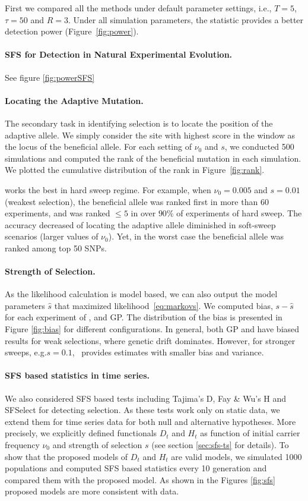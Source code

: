 \documentclass[11pt]{article}
\def\comale{\text{COMALE }}
\begin{document}
First we compared all the methods under default parameter settings,
i.e., $T=5$, $\tau=50$ and $R=3$. Under all simulation parameters, the
\comale statistic provides a better detection power
(Figure~\ref{fig:power}).


\paragraph{SFS for Detection in Natural Experimental Evolution.} See figure \ref{fig:powerSFS}
\paragraph{Locating the Adaptive Mutation.}
The secondary task in identifying selection is to locate the position
of the adaptive allele. We simply consider the site with highest score
in the window as the locus of the beneficial allele. For each setting
of $\nu_0$ and $s$, we conducted 500 simulations
and computed the rank of the beneficial mutation in each
simulation. We plotted the cumulative distribution of the rank in
Figure~\ref{fig:rank}.

\comale works the best in hard sweep regime. For example, when
$\nu_0=0.005$ and $s=0.01$ (weakest selection), the beneficial allele
was ranked first in more than 60 experiments, and was ranked $\le 5$
in over $90$\% of experiments of hard sweep. The accuracy decreased of
locating the adaptive allele diminished in soft-sweep scenarios
(larger values of $\nu_0$). Yet, in the worst case the beneficial
allele was ranked among top 50 SNPs.

\paragraph{Strength of Selection.}
As the likelihood calculation is model based, we can also output the
model parameters $\hat{s}$ that maximized
likelihood~\eqref{eq:markovs}.  We computed bias, $s-\hat{s}$ for each
experiment of \comale, and GP. The distribution of the bias is
presented in Figure \ref{fig:bias} for different configurations. In
general, both GP and \comale have biased results for weak selections,
where genetic drift dominates. However, for stronger sweeps,
e.g.$s=0.1$, \comale\ provides estimates with smaller bias and
variance.


\paragraph{SFS based statistics in time series.} 
We also considered SFS based tests including Tajima's D, Fay \& Wu's H and 
SFSelect for detecting selection. 
As these tests work only on static data, we extend them for time series data 
for both null and alternative hypotheses.
More precisely, we explicitly defined functionals $D_t$ and $H_t$ as function 
of initial carrier frequency $\nu_0$ and strength of selection $s$ (see section 
\ref{sec:sfs-ts} for details).
 To show that the proposed models of $D_t$ and $H_t$ are valid models, we 
 simulated 1000 populations and computed SFS based statistics every 10 
 generation and compared them with the proposed model.
 As shown in the Figures \ref{fig:sfs} proposed models are more consistent with data.
\end{document}
